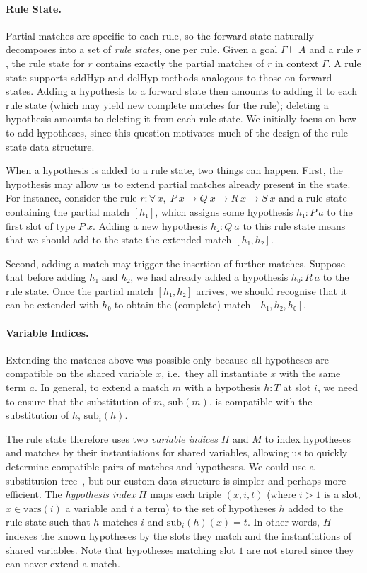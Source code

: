 \documentclass[runningheads,leqno]{llncs}
\newcommand{\All}[2]{\ensuremath{\forall\, #1,\; #2}}
\newcommand{\vars}{\ensuremath{\mathrm{vars}}}
\newcommand{\sub}{\ensuremath{\mathrm{sub}}}
\newcommand{\addHyp}{\ensuremath{\mathrm{addHyp}}}
\newcommand{\delHyp}{\ensuremath{\mathrm{delHyp}}}
\begin{document}
\paragraph{Rule State.}
Partial matches are specific to each rule, so the forward state naturally decomposes into a set of \emph{rule states}, one per rule.
Given a goal $Γ ⊢ A$ and a rule $r$, the rule state for $r$ contains exactly the partial matches of $r$ in context $Γ$.
A rule state supports $\addHyp$ and $\delHyp$ methods analogous to those on forward states.
Adding a hypothesis to a forward state then amounts to adding it to each rule state (which may yield new complete matches for the rule); deleting a hypothesis amounts to deleting it from each rule state.
We initially focus on how to add hypotheses, since this question motivates much of the design of the rule state data structure.

When a hypothesis is added to a rule state, two things can happen.
First, the hypothesis may allow us to extend partial matches already present in the state.
For instance, consider the rule $r : \All{x}{P~x → Q~x → R~x → S~x}$ and a rule state containing the partial match $[h₁]$, which assigns some hypothesis $h₁ : P~a$ to the first slot of type $P~x$.
Adding a new hypothesis $h₂ : Q~a$ to this rule state means that we should add to the state the extended match $[h₁, h₂]$.

Second, adding a match may trigger the insertion of further matches.
Suppose that before adding $h₁$ and $h₂$, we had already added a hypothesis $h₀ : R~a$ to the rule state.
Once the partial match $[h₁, h₂]$ arrives, we should recognise that it can be extended with $h₀$ to obtain the (complete) match $[h₁, h₂, h₀]$.

\paragraph{Variable Indices.}
Extending the matches above was possible only because all hypotheses are compatible on the shared variable $x$, i.e.\ they all instantiate $x$ with the same term $a$.
In general, to extend a match $m$ with a hypothesis $h : T$ at slot $i$, we need to ensure that the substitution of $m$, $\sub(m)$, is compatible with the substitution of $h$, $\sub_{i}(h)$.

The rule state therefore uses two \emph{variable indices} $H$ and $M$ to index hypotheses and matches by their instantiations for shared variables, allowing us to quickly determine compatible pairs of matches and hypotheses.
We could use a substitution tree~\cite{SubstitutionTrees}, but our custom data structure is simpler and perhaps more efficient.
The \emph{hypothesis index} $H$ maps each triple $(x, i, t)$ (where $i > 1$ is a slot, $x ∈ \vars(i)$ a variable and $t$ a term) to the set of hypotheses $h$ added to the rule state such that $h$ matches $i$ and $\sub_{i}(h)(x) = t$.
In other words, $H$ indexes the known hypotheses by the slots they match and the instantiations of shared variables.
Note that hypotheses matching slot $1$ are not stored since they can never extend a match.
\end{document}
